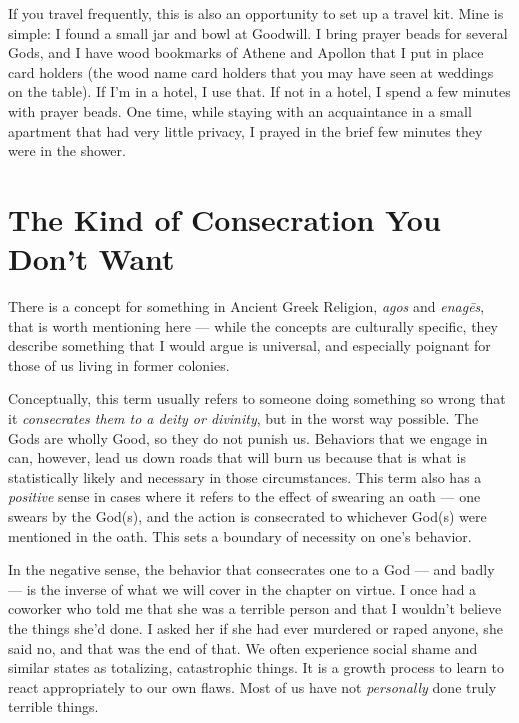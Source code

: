 \documentclass[
]{book}
\begin{document}
If you travel frequently, this is also an opportunity to set up a travel kit. Mine is simple: I found a small jar and bowl at Goodwill. I bring prayer beads for several Gods, and I have wood bookmarks of Athene and Apollon that I put in place card holders (the wood name card holders that you may have seen at weddings on the table). If I'm in a hotel, I use that. If not in a hotel, I spend a few minutes with prayer beads. One time, while staying with an acquaintance in a small apartment that had very little privacy, I prayed in the brief few minutes they were in the shower.

\hypertarget{the-kind-of-consecration-you-dont-want}{%
\section{The Kind of Consecration You Don't Want}\label{the-kind-of-consecration-you-dont-want}}

There is a concept for something in Ancient Greek Religion, \emph{agos} and \emph{enagēs}, that is worth mentioning here --- while the concepts are culturally specific, they describe something that I would argue is universal, and especially poignant for those of us living in former colonies.

Conceptually, this term usually refers to someone doing something so wrong that it \emph{consecrates them to a deity or divinity}, but in the worst way possible. The Gods are wholly Good, so they do not punish us. Behaviors that we engage in can, however, lead us down roads that will burn us because that is what is statistically likely and necessary in those circumstances. This term also has a \emph{positive} sense in cases where it refers to the effect of swearing an oath --- one swears by the God(s), and the action is consecrated to whichever God(s) were mentioned in the oath. This sets a boundary of necessity on one's behavior.

In the negative sense, the behavior that consecrates one to a God --- and badly --- is the inverse of what we will cover in the chapter on virtue. I once had a coworker who told me that she was a terrible person and that I wouldn't believe the things she'd done. I asked her if she had ever murdered or raped anyone, she said no, and that was the end of that. We often experience social shame and similar states as totalizing, catastrophic things. It is a growth process to learn to react appropriately to our own flaws. Most of us have not \emph{personally} done truly terrible things.
\end{document}
